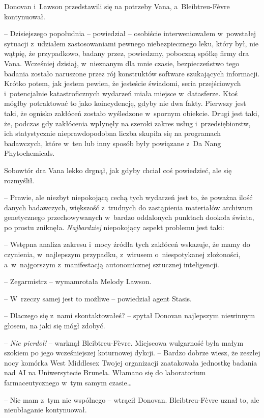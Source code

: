\documentclass[oneside,polish,11pt,sfheadings]{mwbk}
\begin{document}
Donovan i~Lawson przedstawili się na potrzeby Vana, a~Bleibtreu-Fèvre
kontynuował.

-- Dzisiejszego popołudnia -- powiedział -- osobiście interweniowałem w~powstałej sytuacji z~udziałem zastosowaniami pewnego niebezpiecznego
leku, który był, nie wątpię, że przypadkowo, badany przez, powiedzmy,
poboczną spółkę firmy dra Vana. Wcześniej dzisiaj, w~nieznanym dla mnie
czasie, bezpieczeństwo tego badania zostało naruszone przez rój
konstruktów software szukających informacji. Krótko potem, jak jestem
pewien, że jesteście świadomi, seria przejściowych i~potencjalnie
katastroficznych wydarzeń miała miejsce w~datasferze. Ktoś mógłby
potraktować to jako koincydencję, gdyby nie dwa fakty. Pierwszy jest
taki, że ognisko zakłóceń zostało wyśledzone w~spornym obiekcie. Drugi
jest taki, że, podczas gdy zakłócenia wpłynęły na szeroki zakres usług i~przedsiębiorstw, ich statystycznie nieprawdopodobna liczba skupiła się
na programach badawczych, które w~ten lub inny sposób były powiązane z~Da Nang Phytochemicals.

Sobowtór dra Vana lekko drgnął, jak gdyby chciał coś powiedzieć, ale się
rozmyślił.

-- Prawie, ale niezbyt niepokojącą cechą tych wydarzeń jest to, że
poważna ilość danych badawczych, większość z~trudnych do zastąpienia
materiałów archiwum genetycznego przechowywanych w~bardzo oddalonych
punktach dookoła świata, po prostu zniknęła. \emph{Najbardziej}
niepokojący aspekt problemu jest taki:

-- Wstępna analiza zakresu i~mocy źródła tych zakłóceń wskazuje, że mamy
do czynienia, w~najlepszym przypadku, z~wirusem o~niespotykanej
złożoności, a~w~najgorszym z~manifestacją autonomicznej sztucznej
inteligencji.

-- Zegarmistrz -- wymamrotała Melody Lawson.

-- W~rzeczy samej jest to możliwe -- powiedział agent Stasis.

-- Dlaczego się z~nami skontaktowałeś? -- spytał Donovan najlepszym
niewinnym głosem, na jaki się mógł zdobyć.

-- \emph{Nie pierdol!} -- warknął Bleibtreu-Fèvre. Miejscowa wulgarność
była małym szokiem po jego wcześniejszej koturnowej dykcji. -- Bardzo
dobrze wiesz, że zeszłej nocy komórka West Middlesex Twojej organizacji
zaatakowała jednostkę badania nad AI na Uniwersytecie Brunela. Włamano
się do laboratorium farmaceutycznego w~tym samym czasie\ldots

-- Nie mam z~tym nic wspólnego -- wtrącił Donovan. Bleibtreu-Fèvre uznał
to, ale nieubłaganie kontynuował.
\end{document}
